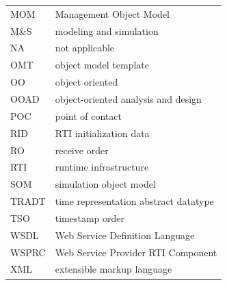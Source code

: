 {\begin{tabular}{@{}p{0.528in}p{4.75in}@{}}
        MOM   & Management Object Model                      \\
        M\&S  & modeling and simulation                      \\
        NA    & not applicable                               \\
        OMT   & object model template                        \\
        OO    & object oriented                              \\
        OOAD  & object-oriented analysis and design          \\
        POC   & point of contact                             \\
        RID   & RTI initialization data                      \\
        RO    & receive order                                \\
        RTI   & runtime infrastructure                       \\
        SOM   & simulation object model                      \\
        TRADT & time representation abstract datatype        \\
        TSO   & timestamp order                              \\
        WSDL  & Web Service Definition Language              \\
        WSPRC & Web Service Provider RTI Component           \\
        XML   & extensible markup language                   \\
    \end{tabular}}
\setlength{\parskip}{6pt}%
